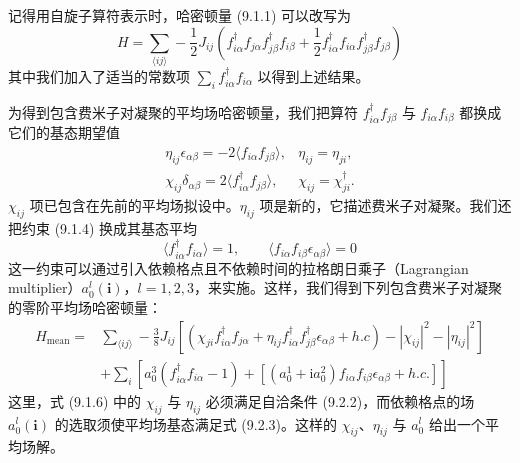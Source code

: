 记得用自旋子算符表示时，哈密顿量 (9.1.1) 可以改写为
\begin{equation*}
H=\sum_{\langle ij\rangle}-\frac{1}{2}J_{ij}\left(f^{\dagger}_{i\alpha}f_{j\alpha}f^{\dagger}_{j\beta}f_{i\beta}+\frac{1}{2}f^{\dagger}_{i\alpha}f_{i\alpha}f^{\dagger}_{j\beta}f_{j\beta}\right)
\tag{9.2.1}
\end{equation*}
其中我们加入了适当的常数项 $\sum_if^{\dagger}_{i\alpha}f_{i\alpha}$ 以得到上述结果。

为得到包含费米子对凝聚的平均场哈密顿量，我们把算符 $f^{\dagger}_{i\alpha}f_{j\beta}$ 与 $f_{i\alpha}f_{i\beta}$ 都换成它们的基态期望值
\begin{equation*}
\begin{array}{ll}
\eta_{ij}\epsilon_{\alpha\beta}=-2\langle f_{i\alpha}f_{j\beta}\rangle, & \eta_{ij}=\eta_{ji},\\
\chi_{ij}\delta_{\alpha\beta}=2\langle f^{\dagger}_{i\alpha}f_{j\beta}\rangle, & \chi_{ij}=\chi^{\dagger}_{ji}.
\end{array}
\tag{9.2.2}
\end{equation*}
$\chi_{ij}$ 项已包含在先前的平均场拟设中。$\eta_{ij}$ 项是新的，它描述费米子对凝聚。我们还把约束 (9.1.4) 换成其基态平均
\begin{equation*}
\langle f^{\dagger}_{i\alpha}f_{i\alpha}\rangle=1,\qquad \langle f_{i\alpha}f_{i\beta}\epsilon_{\alpha\beta}\rangle=0
\tag{9.2.3}
\end{equation*}
这一约束可以通过引入依赖格点且不依赖时间的拉格朗日乘子（Lagrangian multiplier）$a^l_0(\pmb{i})$，$l=1,2,3$，来实施。这样，我们得到下列包含费米子对凝聚的零阶平均场哈密顿量：
\begin{equation*}
\begin{aligned}
H_{\text{mean}}={}&\sum_{\langle ij\rangle}-\frac{3}{8}J_{ij}\left[(\chi_{ji}f^{\dagger}_{i\alpha}f_{j\alpha}+\eta_{ij}f^{\dagger}_{i\alpha}f^{\dagger}_{j\beta}\epsilon_{\alpha\beta}+h.c)-|\chi_{ij}|^2-|\eta_{ij}|^2\right]\\
&+\sum_i\left[a^3_0(f^{\dagger}_{i\alpha}f_{i\alpha}-1)+[(a^1_0+\mathrm{i}a^2_0)f_{i\alpha}f_{i\beta}\epsilon_{\alpha\beta}+h.c.]\right]
\end{aligned}
\tag{9.2.4}
\end{equation*}
这里，式 (9.1.6) 中的 $\chi_{ij}$ 与 $\eta_{ij}$ 必须满足自洽条件 (9.2.2)，而依赖格点的场 $a^l_0(\pmb{i})$ 的选取须使平均场基态满足式 (9.2.3)。这样的 $\chi_{ij}$、$\eta_{ij}$ 与 $a^l_0$ 给出一个平均场解。

